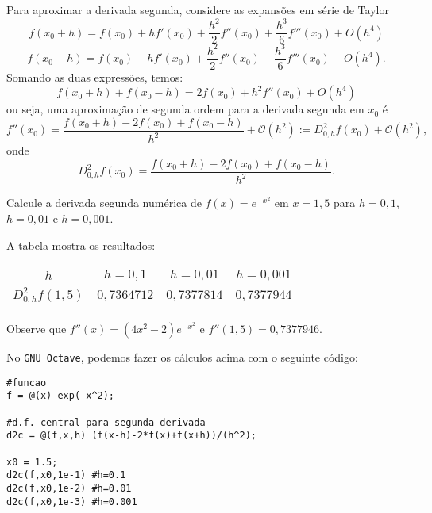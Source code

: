 Para aproximar a derivada segunda, considere as expansões em série de Taylor
\begin{equation}
f(x_0+h)=f(x_0)+hf'(x_0)+\frac{h^2}{2}f''(x_0)+\frac{h^3}{6}f'''(x_0)+O(h^4)
\end{equation}
\begin{equation}
f(x_0-h)=f(x_0)-hf'(x_0)+\frac{h^2}{2}f''(x_0)-\frac{h^3}{6}f'''(x_0)+O(h^4).
\end{equation}
Somando as duas expressões, temos:
\begin{equation}
f(x_0+h)+f(x_0-h)=2f(x_0)+h^2f''(x_0)+O(h^4)
\end{equation}
ou seja, uma aproximação de segunda ordem para a derivada segunda em $x_0$ é
\begin{equation}
f''(x_0)=\frac{f(x_0+h)-2f(x_0)+f(x_0-h)}{h^2}+\mathcal{O}(h^2):=D^2_{0,h}f(x_0)+\mathcal{O}(h^2),
\end{equation}
onde
\begin{equation}
D^2_{0,h}f(x_0)=\frac{f(x_0+h)-2f(x_0)+f(x_0-h)}{h^2}.
\end{equation}

\begin{ex}
Calcule a derivada segunda numérica de $f(x)=e^{-x^2}$ em $x=1,5$ para $h=0,1$, $h=0,01$ e $h=0,001$.
\end{ex}
\begin{sol}
A tabela mostra os resultados:
\begin{center}
  \begin{tabular}{|c|c|c|c|}\hline
    $h$ & $h=0,1$ & $h=0,01$ & $h=0,001$\\\hline
    $D^2_{0,h}f(1,5)$ & $0,7364712$ & $0,7377814$ & $0,7377944$\\\hline
  \end{tabular}  
\end{center}
Observe que $f''(x)=(4x^2-2)e^{-x^2}$ e $f''(1,5)=0,7377946$.  

\ifisoctave
No \verb+GNU Octave+, podemos fazer os cálculos acima com o seguinte código:
\begin{verbatim}
#funcao
f = @(x) exp(-x^2);

#d.f. central para segunda derivada
d2c = @(f,x,h) (f(x-h)-2*f(x)+f(x+h))/(h^2);

x0 = 1.5;
d2c(f,x0,1e-1) #h=0.1
d2c(f,x0,1e-2) #h=0.01
d2c(f,x0,1e-3) #h=0.001
\end{verbatim}
\fi
\end{sol}

